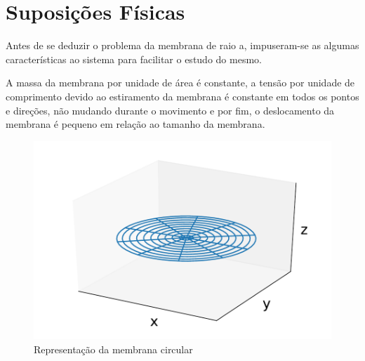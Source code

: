 \documentclass[10pt]{SelfArx} %
\begin{document}
\flushbottom %

\maketitle %


\thispagestyle{empty} %


\section*{Suposições Físicas} %

Antes de se deduzir o problema da membrana de raio a, impuseram-se as algumas características ao sistema para facilitar o estudo do mesmo. \par A massa da membrana por unidade de área é constante, a tensão por unidade de comprimento devido ao estiramento da membrana é constante em todos os pontos e direções, não mudando durante o movimento e por fim, o deslocamento da membrana é pequeno em relação ao tamanho da membrana.

\vspace{-0.3cm}
\begin{figure}[ht]
\centering
\captionsetup{justification=centering}
\includegraphics[width=0.8\linewidth]{TCFE_4/membrana.pdf}
\caption{Representação da membrana circular}
\end{figure}
\end{document}
